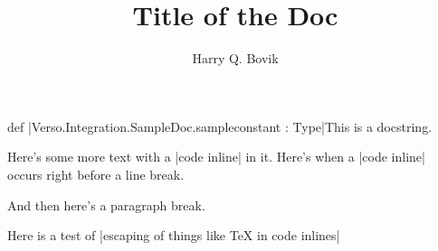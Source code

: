 \documentclass[oneside]{memoir}
\title{\sffamily Title of the Doc}
\author{\sffamily Harry Q. Bovik}
\date{\sffamily }
\begin{document}
\frontmatter

\begin{titlingpage}
\maketitle
\end{titlingpage}

\tableofcontents


\cleardoublepage
\begin{docstringBox}{def}
\LeanVerb|Verso.\allowbreak{}Integration.\allowbreak{}Sample\-Doc.\allowbreak{}sampleconstant : Type|\tcblower This is a docstring.

Here's some more text with a \LeanVerb|code inline| in it.
Here's when a \LeanVerb|code inline|
occurs right before a line break.

And then here's a paragraph break.


\end{docstringBox}



Here is a test of \LeanVerb|escaping of things like TeX in code inlines|



\mainmatter
\end{document}
